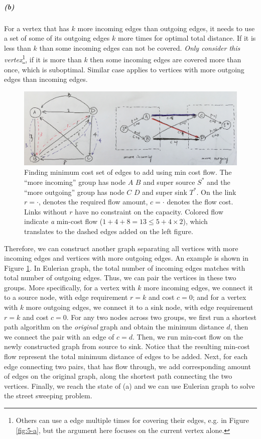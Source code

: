 \documentclass[12pt]{article}
\begin{document}
\subparagraph{(b)} For a vertex that has $k$ more incoming edges than outgoing edges, it needs to use a set of some of its outgoing edges $k$ more times for optimal total distance. If it is less than $k$ than some incoming edges can not be covered. \emph{Only consider this vertex}\footnote{Others can use a edge multiple times for covering their edges, e.g. in Figure \ref{fig:5-a}, but the argument here focuses on the current vertex alone.}, if it is more than $k$ then some incoming edges are covered more than once, which is suboptimal. Similar case applies to vertices with more outgoing edges than incoming edges.
\begin{figure}[h!]
	\centering
	\includegraphics[width=1\textwidth]{5-b.jpg}
	\caption{Finding minimum cost set of edges to add using min cost flow. The ``more incoming'' group has node $A$ $B$ and super source $S^*$ and the ``more outgoing'' group has node $C$ $D$ and super sink $T^*$. On the link $r=\cdot$, denotes the required flow amount, $c=\cdot$ denotes the flow cost. Links without $r$ have no constraint on the capacity. Colored flow indicate \emph{a} min-cost flow ($1+4+8 = 13 \leq 5 + 4 \times 2$), which translates to the dashed edges added on the left figure.} \label{fig:5-b}
\end{figure}

Therefore, we can construct another graph separating all vertices with more incoming edges and vertices with more outgoing edges. An example is shown in Figure \ref{fig:5-b}. In Eulerian graph, the total number of incoming edges matches with total number of outgoing edges. Thus, we can pair the vertices in these two groups. More specifically, for a vertex with $k$ more incoming edges, we connect it to a source node, with edge requirement $r=k$ and cost $c=0$; and for a vertex with $k$ more outgoing edges, we connect it to a sink node, with edge requirement $r=k$ and cost $c=0$. For any two nodes across two groups, we first run a shortest path algorithm on the \emph{original} graph and obtain the minimum distance $d$, then we connect the pair with an edge of $c=d$. Then, we run min-cost flow on the newly constructed graph from source to sink. Notice that the resulting min-cost flow represent the total minimum distance of edges to be added. Next, for each edge connecting two pairs, that has flow through, we add corresponding amount of edges on the original graph, along the shortest path connecting the two vertices. Finally, we reach the state of (a) and we can use Eulerian graph to solve the street sweeping problem.
\end{document}
